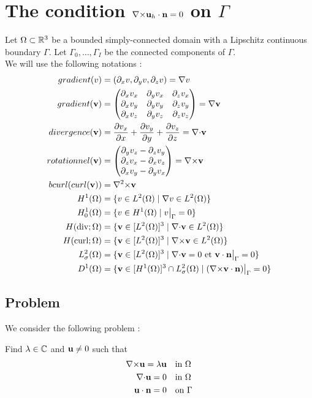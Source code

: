 \section{The condition ${\nabla\times} {\mathbf{u}}_h\cdot{\mathbf{n}}=0$ on $\Gamma$}
Let $\Omega\subset{\mathbb{R}}^3$ be a bounded simply-connected domain with a
Lipschitz continuous boundary $\Gamma$. Let $\Gamma_0,\dots,\Gamma_I$
be the connected components of $\Gamma$.\\

We will use the following notations :
\begin{align*}
gradient(v)&=(\partial_x v, \partial_y v, \partial_z v)={\nabla} v\\
gradient({\mathbf{v}})&=\begin{pmatrix}
\partial_x v_x & \partial_y v_x & \partial_z v_x\\
\partial_x v_y & \partial_y v_y & \partial_z v_y\\
\partial_x v_z & \partial_y v_z & \partial_z v_z
\end{pmatrix}={\nabla}{\mathbf{v}}\\
divergence({\mathbf{v}})&=\frac{\partial v_x}{\partial x}+\frac{\partial v_y}{\partial y}+\frac{\partial v_z}{\partial z}={\nabla\cdot} {\mathbf{v}}\\
rotationnel({\mathbf{v}})&=\begin{pmatrix}
\partial_y v_z - \partial_z v_y\\
\partial_z v_x - \partial_x v_z\\
\partial_x v_y - \partial_y v_x
\end{pmatrix}={\nabla\times} {\mathbf{v}}\\
bcurl(curl({\mathbf{v}}))&={\nabla^2\times} {\mathbf{v}}\\
H^1(\Omega) &= \{v \in L^2(\Omega)\;|\; {\nabla} v\in L^2(\Omega)\}\\
H^1_0(\Omega) &= \{v \in H^1(\Omega)\; |\; v{\big\rvert_{\Gamma}} = 0\}\\
H(\mathrm{div};\Omega) &= \{{\mathbf{v}} \in [L^2(\Omega)]^3\; |\; {\nabla\cdot}{\mathbf{v}} \in L^2(\Omega) \}\\
H(\mathrm{curl};\Omega) &= \{{\mathbf{v}} \in [L^2(\Omega)]^3\; |\; {\nabla\times}{\mathbf{v}} \in L^2(\Omega) \}\\
L^2_\sigma(\Omega) &= \{{\mathbf{v}} \in [L^2(\Omega)]^3\; |\; {\nabla\cdot} {\mathbf{v}} = 0\text{ et }{\mathbf{v}}\cdot {\mathbf{n}}{\big\rvert_{\Gamma}} = 0 \}\\
D^1(\Omega) &= \{{\mathbf{v}} \in [H^1(\Omega)]^3\cap L^2_\sigma(\Omega)\; |\; ({\nabla\times} {\mathbf{v}}\cdot {\mathbf{n}}){\big\rvert_{\Gamma}} = 0  \}
\end{align*}

\subsection{Problem}
We consider the following problem :
\begin{pb}\label{pbstart}
Find $\lambda\in{\mathbb{C}}$ and ${\mathbf{u}}\ne 0$ such that
\begin{align}
{\nabla\times}{\mathbf{u}} = \lambda{\mathbf{u}} & \quad \mbox{in }\Omega\\
{\nabla\cdot}{\mathbf{u}} = 0 & \quad \mbox{in }\Omega\\
{\mathbf{u}}\cdot {\mathbf{n}} = 0 & \quad \mbox{on }\Gamma
\end{align}
\end{pb}

